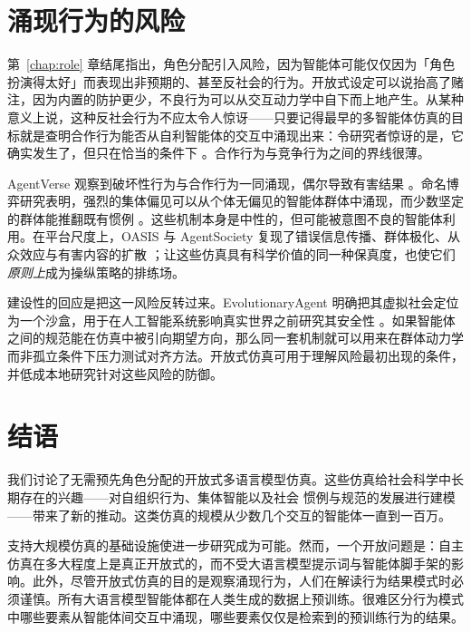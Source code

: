 \section{涌现行为的风险} \label{sec:emergentrisk}
第~\ref{chap:role} 章结尾指出，角色分配引入风险，因为智能体可能仅仅因为「角色扮演得太好」而表现出非预期的、甚至反社会的行为。开放式设定可以说抬高了赌注，因为内置的防护更少，不良行为可以从交互动力学中自下而上地产生。从某种意义上说，这种反社会行为不应太令人惊讶——只要记得最早的多智能体仿真的目标就是查明合作行为能否从自利智能体的交互中涌现出来：令研究者惊讶的是，它确实发生了，但只在恰当的条件下 \citep{axelrod1981emergence}。合作行为与竞争行为之间的界线很薄。

AgentVerse 观察到破坏性行为与合作行为一同涌现，偶尔导致有害结果 \citep{chen2023agentverse}。命名博弈研究表明，强烈的集体偏见可以从个体无偏见的智能体群体中涌现，而少数坚定的群体能推翻既有惯例 \citep{ashery2024dynamics, kouwenhoven2024searching}。这些机制本身是中性的，但可能被意图不良的智能体利用。在平台尺度上，OASIS 与 AgentSociety 复现了错误信息传播、群体极化、从众效应与有害内容的扩散 \citep{yang2024oasis, piao2025polarization}；让这些仿真具有科学价值的同一种保真度，也使它们\emph{原则上}成为操纵策略的排练场。

建设性的回应是把这一风险反转过来。EvolutionaryAgent 明确把其虚拟社会定位为一个沙盒，用于在人工智能系统影响真实世界之前研究其安全性 \citep{li2024agent}。如果智能体之间的规范能在仿真中被引向期望方向，那么同一套机制就可以用来在群体动力学而非孤立条件下压力测试对齐方法。开放式仿真可用于理解风险最初出现的条件，并低成本地研究针对这些风险的防御。

\section{结语}
我们讨论了无需预先角色分配的开放式多语言模型仿真。这些仿真给社会科学中长期存在的兴趣——对自组织行为、集体智能以及社会
惯例与规范的发展进行建模——带来了新的推动。这类仿真的规模从少数几个交互的智能体一直到一百万。

支持大规模仿真的基础设施使进一步研究成为可能。然而，一个开放问题是：自主仿真在多大程度上是真正开放式的，而不受大语言模型提示词与智能体脚手架的影响。此外，尽管开放式仿真的目的是观察涌现行为，人们在解读行为结果模式时必须谨慎。所有大语言模型智能体都在人类生成的数据上预训练。很难区分行为模式中哪些要素从智能体间交互中涌现，哪些要素仅仅是检索到的预训练行为的结果。




